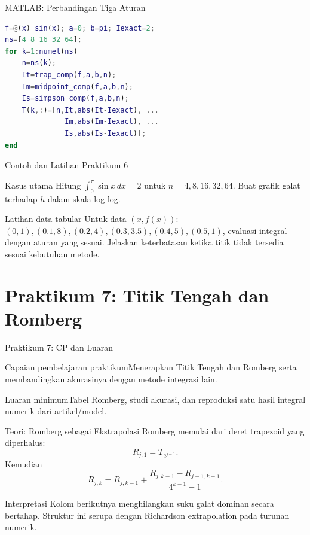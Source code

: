 \documentclass[slides,english,noindex,lean,nobackpage,nocopyright,noupdate,nosummary]{enacom}
\newcommand{\CPBox}[1]{\begin{block}{Capaian pembelajaran praktikum}#1\end{block}}
\newcommand{\OutBox}[1]{\begin{exampleblock}{Luaran minimum}#1\end{exampleblock}}
\begin{document}
\begin{frame}{MATLAB: Perbandingan Tiga Aturan}
\begin{lstlisting}[language=Matlab]
f=@(x) sin(x); a=0; b=pi; Iexact=2;
ns=[4 8 16 32 64];
for k=1:numel(ns)
    n=ns(k);
    It=trap_comp(f,a,b,n);
    Im=midpoint_comp(f,a,b,n);
    Is=simpson_comp(f,a,b,n);
    T(k,:)=[n,It,abs(It-Iexact), ...
              Im,abs(Im-Iexact), ...
              Is,abs(Is-Iexact)];
end
\end{lstlisting}
\end{frame}

\begin{frame}{Contoh dan Latihan Praktikum 6}
\begin{exampleblock}{Kasus utama}
Hitung $\int_0^\pi\sin x\,dx=2$ untuk $n=4,8,16,32,64$. Buat grafik galat terhadap $h$ dalam skala log-log.
\end{exampleblock}
\begin{exampleblock}{Latihan data tabular}
Untuk data $(x,f(x))$: $(0,1),(0.1,8),(0.2,4),(0.3,3.5),(0.4,5),(0.5,1)$, evaluasi integral dengan aturan yang sesuai. Jelaskan keterbatasan ketika titik tidak tersedia sesuai kebutuhan metode.
\end{exampleblock}
\end{frame}

\section{Praktikum 7: Titik Tengah dan Romberg}

\begin{frame}{Praktikum 7: CP dan Luaran}
\CPBox{Menerapkan Titik Tengah dan Romberg serta membandingkan akurasinya dengan metode integrasi lain.}
\OutBox{Tabel Romberg, studi akurasi, dan reproduksi satu hasil integral numerik dari artikel/model.}
\end{frame}

\begin{frame}{Teori: Romberg sebagai Ekstrapolasi}
Romberg memulai dari deret trapezoid yang diperhalus:
\[
R_{j,1}=T_{2^{j-1}}.
\]
Kemudian
\[
R_{j,k}=R_{j,k-1}+\frac{R_{j,k-1}-R_{j-1,k-1}}{4^{k-1}-1}.
\]
\begin{block}{Interpretasi}
Kolom berikutnya menghilangkan suku galat dominan secara bertahap. Struktur ini serupa dengan Richardson extrapolation pada turunan numerik.
\end{block}
\end{frame}
\end{document}
